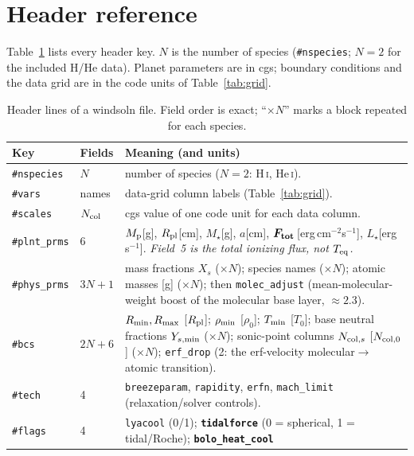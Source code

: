 \documentclass[english,a4paper]{my_memo}
\newcommand{\code}[1]{\texttt{#1}}
\newcommand{\Rp}{R_{\rm pl}}
\newcommand{\Ftot}{F_{\rm tot}}
\newcommand{\hd}[1]{\code{\##1}}      %
\begin{document}
\section{Header reference}
Table~\ref{tab:hdr} lists every header key. $N$ is the number of species
(\hd{nspecies}; $N=2$ for the included H/He data). Planet parameters are in
cgs; boundary conditions and the data grid are in the code units of
Table~\ref{tab:grid}.

\begin{table}[t]\centering\small
\caption{Header lines of a windsoln file. Field order is exact;
``$\times N$'' marks a block repeated for each species.}
\label{tab:hdr}
\begin{tabular}{@{}l l p{8.4cm}@{}}
\toprule
Key & Fields & Meaning (and units) \\
\midrule
\hd{nspecies}  & $N$ & number of species ($N=2$: H\,\textsc{i}, He\,\textsc{i}). \\
\hd{vars}      & names & data-grid column labels (Table~\ref{tab:grid}). \\
\hd{scales}    & $N_{\rm col}$ & cgs value of one code unit for each data column. \\
\hd{plnt\_prms}& 6 & $M_{\rm p}$[g], $\Rp$[cm], $M_\star$[g], $a$[cm],
                     $\boldsymbol{\Ftot}$\,[erg\,cm$^{-2}$s$^{-1}$],
                     $L_\star$[erg\,s$^{-1}$]. \emph{Field~5 is the total
                     ionizing flux, not $T_{\rm eq}$.} \\
\hd{phys\_prms}& $3N{+}1$ & mass fractions $X_s$ ($\times N$); species names
                     ($\times N$); atomic masses [g] ($\times N$);
                     then \code{molec\_adjust} (mean-molecular-weight boost
                     of the molecular base layer, $\approx2.3$). \\
\hd{bcs}       & $2N{+}6$ & $R_{\rm min},R_{\rm max}$ [$\Rp$];
                     $\rho_{\rm min}$ [$\rho_0$]; $T_{\rm min}$ [$T_0$];
                     base neutral fractions $Y_{s,\rm min}$ ($\times N$);
                     sonic-point columns $N_{{\rm col},s}$ [$N_{\rm col,0}$]
                     ($\times N$); \code{erf\_drop} (2: the erf-velocity
                     molecular$\to$atomic transition). \\
\hd{tech}      & 4 & \code{breezeparam}, \code{rapidity}, \code{erfn},
                     \code{mach\_limit} (relaxation/solver controls). \\
\hd{flags}     & 4 & \code{lyacool} (0/1); \textbf{\code{tidalforce}}
                     (0 = spherical, 1 = tidal/Roche); \textbf{\code{bolo\_heat\_cool}}

\end{tabular}
\end{table}
\end{document}
